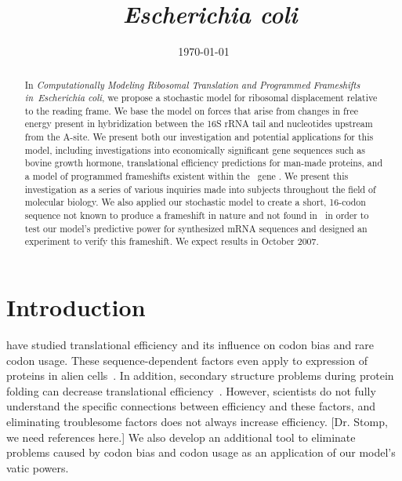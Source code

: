 \documentclass[12pt]{article}
\author{\sc{\BWFauthors}}
\date{{\sc \today}}
\title{\bf{\BWFtitle\ \emph{Escherichia coli}}}
\newcommand{\BWFtitle}{Computationally
  Modeling Ribosomal Translation and Programmed Frameshifts in}
\numberwithin{equation}{section}
\begin{document}
\begin{singlespace}
  \maketitle
  \tableofcontents
\end{singlespace}

\clearpage
\begin{abstract}\begin{normalsize}
  In \emph{\BWFtitle\ Escherichia coli}, we propose a stochastic model
  for ribosomal displacement relative to the reading frame. We base
  the model on forces that arise from changes in free energy present
  in hybridization between the 16S rRNA tail and nucleotides upstream
  from the A-site.  We present both our investigation and potential
  applications for this model, including investigations into
  economically significant gene sequences such as bovine growth
  hormone, translational efficiency predictions for man-made proteins,
  and a model of programmed frameshifts existent within the
  \ecoli\ gene \prfB.  We present this investigation as a series of
  various inquiries made into subjects throughout the field of
  molecular biology.  We also applied our stochastic model to create a
  short, 16-codon sequence not known to produce a frameshift in nature
  and not found in \ecoli\ in order to test our model's predictive
  power for synthesized mRNA sequences and designed an experiment to
  verify this frameshift.  We expect results in October 2007.
\end{normalsize}\end{abstract}
\clearpage
{}

\section{Introduction}
\citet{gustafsson04, ikemura, kane95} have studied translational
efficiency and its influence on codon bias and rare codon usage.
These sequence-dependent factors even apply to expression of proteins
in alien cells~\cite{sorensen05}.  In addition, secondary structure
problems during protein folding can decrease translational
efficiency~\cite{kozak05}.  However, scientists do not fully
understand the specific connections between efficiency and these
factors, and eliminating troublesome factors does not always increase
efficiency.  [Dr. Stomp, we need references here.]  We also develop an
additional tool to eliminate problems caused by codon bias and codon
usage as an application of our model's vatic powers.
\end{document}
